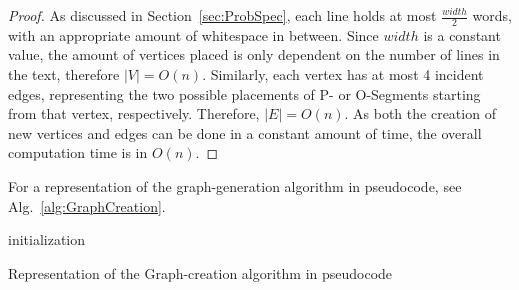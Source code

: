 \documentclass[11pt,a4paper]{vutinfth}
\begin{document}
\begin{proof}
	As discussed in Section~\ref*{sec:ProbSpec}, each line holds at most $\frac{width}{2}$ words, with an appropriate amount of whitespace in between. Since $width$ is a constant value, the amount of vertices placed is only dependent on the number of lines in the text, therefore $|V|=O(n)$.
	Similarly, each vertex has at most 4 incident edges, representing the two possible placements of P- or O-Segments starting from that vertex, respectively. Therefore, $|E|=O(n)$. As both the creation of new vertices and edges can be done in a constant amount of time, the overall computation time is in $O(n)$.
\end{proof}

For a representation of the graph-generation algorithm in pseudocode, see Alg.~\ref*{alg:GraphCreation}.


\begin{algorithm}
\DontPrintSemicolon
{}
  



 initialization\;
 
\caption{Representation of the Graph-creation algorithm in pseudocode}
\label{alg:GraphCreation}
\end{algorithm}
\end{document}
